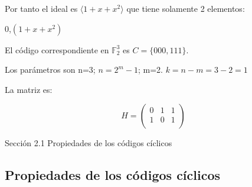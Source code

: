 \documentclass{beamer}
\theoremstyle{plain}
\theoremstyle{example}
\theoremstyle{example}
\begin{document}
\begin{frame}  \small

Por tanto el ideal es $\langle 1 +x+ x^2 \rangle$ que tiene solamente 2 elementos:

\begin{center}
$0$,$(1+x+x^2)$
\end{center}

El código correspondiente en $\mathbb{F}_2^3$ es $C = \{000, 111 \}.$\\
\vspace*{5pt}

Los parámetros son n=3; $n=2^m -1$; m=2. $k =n-m =3-2=1$\\
\vspace*{5pt}

La matriz es: 

\[
    H=   \left( \begin{array}{ccc}
0&	1	& 1	\\		
1&	0	& 1	\\
           			\end{array}
    		\right) 	    		
\]



\end{frame} 

 






\begin{frame}   \footnotesize
{
\begin{block}{Sección 2.1}
Propiedades de los códigos cíclicos\end{block}
}
\end{frame} 


\subsection{Propiedades de los códigos cíclicos}
\end{document}
